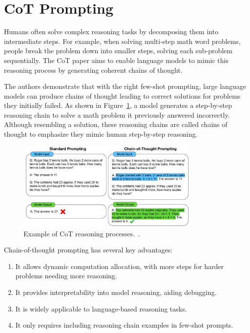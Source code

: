 \documentclass[a4paper,oneside]{book}
\begin{document}
\section{CoT Prompting}
Humans often solve complex reasoning tasks by decomposing them into intermediate steps. For example, when solving multi-step math word problems, people break the problem down into smaller steps, solving each sub-problem sequentially. The CoT paper aims to enable language models to mimic this reasoning process by generating coherent chains of thought.

The authors demonstrate that with the right few-shot prompting, large language models can produce chains of thought leading to correct solutions for problems they initially failed. As shown in Figure~\ref{fig:cot_prompting}, a model generates a step-by-step reasoning chain to solve a math problem it previously answered incorrectly. Although resembling a solution, these reasoning chains are called chains of thought to emphasize they mimic human step-by-step reasoning.

\begin{figure}[H]
    \centering
    \includegraphics[width=0.8\textwidth]{img/cot_prompting.jpg}
    \caption{Example of CoT reasoning processes.~\cite{wei2023chainofthought}.}\label{fig:cot_prompting}
\end{figure}

Chain-of-thought prompting has several key advantages:

\begin{enumerate}
    \item It allows dynamic computation allocation, with more steps for harder problems needing more reasoning.
    \item It provides interpretability into model reasoning, aiding debugging.
    \item It is widely applicable to language-based reasoning tasks.
    \item It only requires including reasoning chain examples in few-shot prompts.
\end{enumerate}
\end{document}
